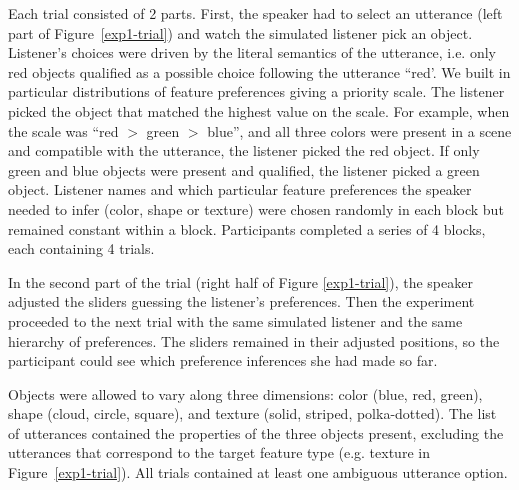 \documentclass[10pt,a4paper]{article}
\begin{document}
Each trial consisted of 2 parts. 
First, the speaker had to select an utterance (left part of Figure~\ref{exp1-trial}) and watch the simulated listener pick an object. Listener's choices were driven by the literal semantics of the utterance, i.e. only red objects qualified as a possible choice following the utterance ``red'. We built in particular distributions of feature preferences giving a priority scale. The listener picked the object that matched the highest value on the scale. For example, when the scale was ``red $>$ green $>$ blue'', and all three colors were present in a scene and compatible with the utterance, the listener picked the red object. If only green and blue objects were present and qualified, the listener picked a green object. Listener names and which particular feature preferences the speaker needed to infer (color, shape or texture) were chosen randomly in each block but remained constant within a block.
Participants completed a series of 4 blocks, each containing 4 trials. 

In the second part of the trial (right half of Figure \ref{exp1-trial}), the speaker adjusted the sliders guessing the listener's preferences. Then the experiment proceeded to the next trial with the same simulated listener and the same hierarchy of preferences. The sliders remained in their adjusted positions, so the participant could see which preference inferences she had made so far.

Objects were allowed to vary along three dimensions: color (blue, red, green), shape (cloud, circle, square), and texture (solid, striped, polka-dotted). The list of utterances contained the properties of the three objects present, excluding the utterances that correspond to the target feature type (e.g. texture in Figure~\ref{exp1-trial}). All trials contained at least one ambiguous utterance option. 

\end{document}
